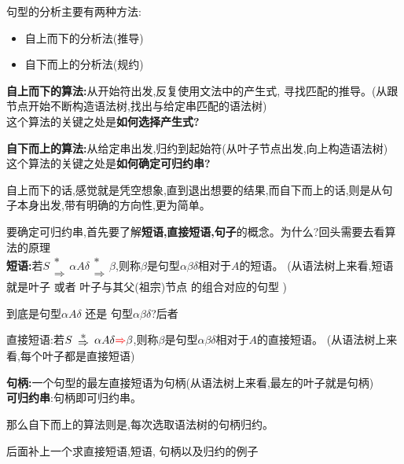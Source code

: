   句型的分析主要有两种方法:
  \begin{itemize}
    \item 自上而下的分析法(推导)
    \item 自下而上的分析法(规约)
  \end{itemize}

  \textbf{自上而下的算法:}从开始符出发,反复使用文法中的产生式,
  寻找匹配的推导。(从跟节点开始不断构造语法树,找出与给定串匹配的语法树)\\
  这个算法的关键之处是\textbf{如何选择产生式?}

  \spaceline
  \textbf{自下而上的算法:}从给定串出发,归约到起始符(从叶子节点出发,向上构造语法树)\\
  这个算法的关键之处是\textbf{如何确定可归约串?}

  自上而下的话,感觉就是凭空想象,直到退出想要的结果,而自下而上的话,则是从句子本身出发,带有明确的方向性,更为简单。

  \spaceline
  要确定可归约串,首先要了解\textbf{短语,直接短语,句子}的概念。{\color{red}为什么?回头需要去看算法的原理}\\
  \textbf{短语:}若$\renewcommand{\arraystretch}{0.5}S\begin{array}{c} * \\ \Rightarrow \end{array} \alpha A\delta
  \begin{array}{c} * \\ \Rightarrow \end{array} \beta$,则称$\beta$是句型{\color{red}$\alpha \beta \delta$}相对于$A$的短语。
    (从语法树上来看,短语就是叶子 或者 叶子与其父(祖宗)节点 的组合对应的句型 )

  {\color{blue}到底是句型$\alpha A \delta$ 还是 句型$\alpha \beta \delta$?后者}

  直接短语:若$\renewcommand{\arraystretch}{0.5}S\begin{array}{c} * \\ \Rightarrow \end{array} \alpha A\delta
   {\color{red}\Rightarrow}  \beta$,则称$\beta$是句型{\color{red}$\alpha \beta \delta$}相对于$A$的直接短语。
   (从语法树上来看,每个叶子都是直接短语)

   \textbf{句柄:}一个句型的最左直接短语为句柄(从语法树上来看,最左的叶子就是句柄)\\
   \textbf{可归约串}:句柄即可归约串。

   那么自下而上的算法则是,每次选取语法树的句柄归约。

   {\color{red} 后面补上一个求直接短语,短语, 句柄以及归约的例子}

